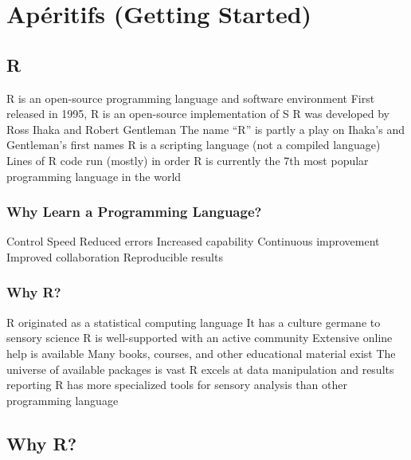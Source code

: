 \documentclass[
]{book}
\begin{document}
\hypertarget{start-R}{%
\chapter{Apéritifs (Getting Started)}\label{start-R}}

\hypertarget{r}{%
\section{R}\label{r}}

R is an open-source programming language and software environment
First released in 1995, R is an open-source implementation of S
R was developed by Ross Ihaka and Robert Gentleman
The name ``R'' is partly a play on Ihaka's and Gentleman's first names
R is a scripting language (not a compiled language)
Lines of R code run (mostly) in order
R is currently the 7th most popular programming language in the world

\hypertarget{why-learn-a-programming-language}{%
\subsection{Why Learn a Programming Language?}\label{why-learn-a-programming-language}}

Control
Speed
Reduced errors
Increased capability
Continuous improvement
Improved collaboration
Reproducible results

\hypertarget{why-r}{%
\subsection{Why R?}\label{why-r}}

R originated as a statistical computing language
It has a culture germane to sensory science
R is well-supported with an active community
Extensive online help is available
Many books, courses, and other educational material exist
The universe of available packages is vast
R excels at data manipulation and results reporting
R has more specialized tools for sensory analysis than other programming language

\hypertarget{why-r-1}{%
\section{Why R?}\label{why-r-1}}
\end{document}
